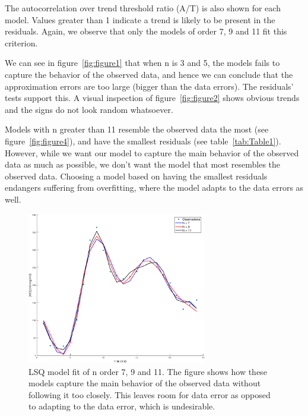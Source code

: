 The autocorrelation over trend threshold ratio (A/T) is also shown for each model. Values greater than 1 indicate a trend is likely to be present in the residuals. Again, we observe that only the models of order 7, 9 and 11 fit this criterion. 

We can see in figure~\ref{fig:figure1} that when n is 3 and 5, the models fails to capture the behavior of the observed data, and hence we can conclude that the approximation errors are too large (bigger than the data errors). The residuals' tests support this. A visual inspection of figure~\ref{fig:figure2} shows obvious trends and the signs do not look random whatsoever. 

Models with n greater than 11 resemble the observed data the most (see figure~\ref{fig:figure4}), and have the smallest residuals (see table~\ref{tab:Table1}). However, while we want our model to capture the main behavior of the observed data as much as possible, we don't want the model that most resembles the observed data. Choosing a model based on having the smallest residuals endangers suffering from overfitting, where the model adapts to the data errors as well.

\begin{figure}[htbp]
\centering
\includegraphics[width=0.7\textwidth]{../img/figure3}
\caption{LSQ model fit of n order 7, 9 and 11. The figure shows how these models capture the main behavior of the observed data without following it too closely. This leaves room for data error as opposed to adapting to the data error, which is undesirable.}
\label{fig:figure3}
\end{figure}


